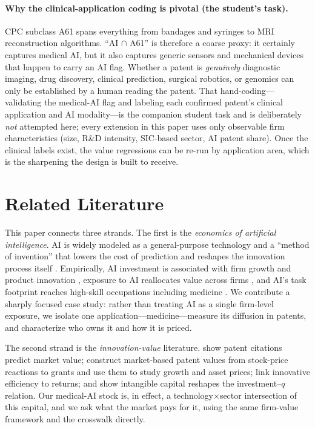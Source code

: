 \documentclass[12pt]{article}
\begin{document}
\paragraph{Why the clinical-application coding is pivotal (the student's task).} CPC subclass A61
spans everything from bandages and syringes to MRI reconstruction algorithms. ``AI $\cap$ A61'' is
therefore a coarse proxy: it certainly captures medical AI, but it also captures generic sensors
and mechanical devices that happen to carry an AI flag. Whether a patent is \emph{genuinely}
diagnostic imaging, drug discovery, clinical prediction, surgical robotics, or genomics can only
be established by a human reading the patent. That hand-coding---validating the medical-AI flag and
labeling each confirmed patent's clinical application and AI modality---is the companion student
task and is deliberately \emph{not} attempted here; every extension in this paper uses only
observable firm characteristics (size, R\&D intensity, SIC-based sector, AI patent share). Once the
clinical labels exist, the value regressions can be re-run by application area, which is the
sharpening the design is built to receive.

\section{Related Literature}\label{sec:lit}
This paper connects three strands. The first is the \emph{economics of artificial intelligence}.
AI is widely modeled as a general-purpose technology and a ``method of invention'' that lowers the
cost of prediction and reshapes the innovation process itself \citep{cockburn2018,agrawal2019,
bianchini2022}. Empirically, AI investment is associated with firm growth and product innovation
\citep{babina2024}, exposure to AI reallocates value across firms \citep{eisfeldt2023}, and AI's
task footprint reaches high-skill occupations including medicine \citep{webb2020}. We contribute a
sharply focused case study: rather than treating AI as a single firm-level exposure, we isolate
one application---medicine---measure its diffusion in patents, and characterize who owns it and how
it is priced.

The second strand is the \emph{innovation-value} literature. \citet{hall2005} show patent citations
predict market value; \citet{kpss2017} construct market-based patent values from stock-price
reactions to grants and use them to study growth and asset prices; \citet{hirshleifer2013} link
innovative efficiency to returns; and \citet{peters2017} show intangible capital reshapes the
investment--$q$ relation. Our medical-AI stock is, in effect, a technology$\times$sector
intersection of this capital, and we ask what the market pays for it, using the same
firm-value framework and the \citet{kpss2017} crosswalk directly.
\end{document}

